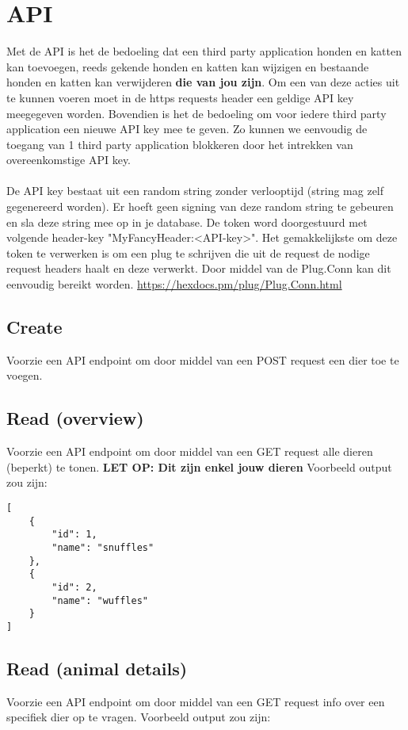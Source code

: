 \documentclass{article}
\begin{document}
\section{API}
Met de API is het de bedoeling dat een third party application honden en katten kan toevoegen, reeds gekende honden en katten kan wijzigen en bestaande honden en katten kan verwijderen \textbf{die van jou zijn}. Om een van deze acties uit te kunnen voeren moet in de https requests header een geldige API key meegegeven worden. Bovendien is het de bedoeling om voor iedere third party application een nieuwe API key mee te geven. Zo kunnen we eenvoudig de toegang van 1 third party application blokkeren door het intrekken van overeenkomstige API key.
\\
\\
De API key bestaat uit een random string zonder verlooptijd (string mag zelf gegenereerd worden). Er hoeft geen signing van deze random string te gebeuren en sla deze string mee op in je database. De token word doorgestuurd met volgende header-key "MyFancyHeader:<API-key>".
Het gemakkelijkste om deze token te verwerken is om een plug te schrijven die uit de request de nodige request headers haalt en deze verwerkt. Door middel van de Plug.Conn kan dit eenvoudig bereikt worden. \url{https://hexdocs.pm/plug/Plug.Conn.html}

\subsection{Create}
Voorzie een API endpoint om door middel van een POST request een dier toe te voegen.

\subsection{Read (overview)}
Voorzie een API endpoint om door middel van een GET request alle dieren (beperkt) te tonen. \textbf{LET OP: Dit zijn enkel jouw dieren} Voorbeeld output zou zijn:

\begin{verbatim}
[
    {
        "id": 1,
        "name": "snuffles"
    },
    {
        "id": 2,
        "name": "wuffles"
    }
]
\end{verbatim}

\subsection{Read (animal details)}
Voorzie een API endpoint om door middel van een GET request info over een specifiek dier op te vragen. Voorbeeld output zou zijn:
\end{document}
